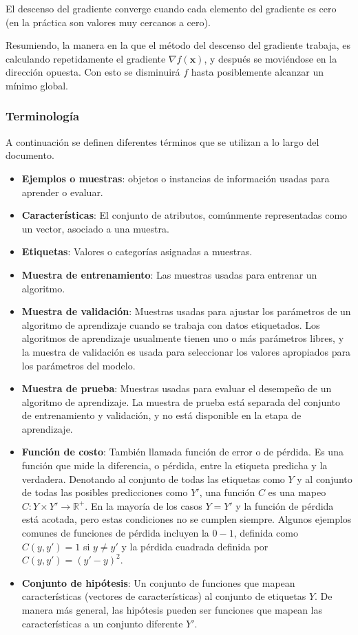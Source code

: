 El descenso del gradiente converge cuando cada elemento del gradiente es 
cero (en la práctica son valores muy cercanos a cero).

Resumiendo, la manera en la que el método del descenso del gradiente
trabaja, es calculando repetidamente el gradiente $\nabla f(\mathbf{x})$,
y después se moviéndose en la dirección opuesta. Con esto se disminuirá $f$ hasta 
posiblemente alcanzar un mínimo global.

\subsubsection{Terminología}

A continuación se definen diferentes términos que se utilizan a lo
largo del documento.

\begin{itemize}

\item
  \textbf{Ejemplos o muestras}: objetos o instancias de información usadas para
  aprender o evaluar.
 \item
 \textbf{Características}: El conjunto de atributos, comúnmente representadas
como un vector, asociado a una muestra. 
\item 
\textbf{Etiquetas}: Valores o categorías
asignadas a muestras. 
\item \textbf{Muestra de entrenamiento}: Las muestras usadas
para entrenar un algoritmo. 
\item 
\textbf{Muestra de validación}: Muestras usadas
para ajustar los parámetros de un algoritmo de aprendizaje cuando se
trabaja con datos etiquetados. Los algoritmos de aprendizaje usualmente
tienen uno o más parámetros libres, y la muestra de validación es usada
para seleccionar los valores apropiados para los parámetros del modelo.
\item 
\textbf{Muestra de prueba}: Muestras usadas para evaluar el desempeño de un
algoritmo de aprendizaje. La muestra de prueba está separada del
conjunto de entrenamiento y validación, y no está disponible en la etapa
de aprendizaje. 
\item
\textbf{Función de costo}: También llamada función de error o de pérdida. 
Es una función que mide la
diferencia, o pérdida, entre la etiqueta predicha y la verdadera.
Denotando al conjunto de todas las etiquetas como $Y$ y al conjunto de
todas las posibles predicciones como $Y'$, una función $C$ es una mapeo $C: Y
 \times Y' \rightarrow \mathbb{R}^+$. En la mayoría de los casos $Y = Y'$ y la función
de pérdida está acotada, pero estas condiciones no se cumplen siempre.
Algunos ejemplos comunes de funciones de pérdida incluyen la $0-1$,
definida como $C(y, y') = 1$ si $y \neq y'$ y la pérdida cuadrada definida por
$C(y, y') = (y' - y)^2$. 
\item
\textbf{Conjunto de hipótesis}: Un conjunto de
funciones que mapean características (vectores de características) al
conjunto de etiquetas $Y$. De manera más general, las hipótesis pueden ser
funciones que mapean las características a un conjunto diferente $Y'$.
\end{itemize}



